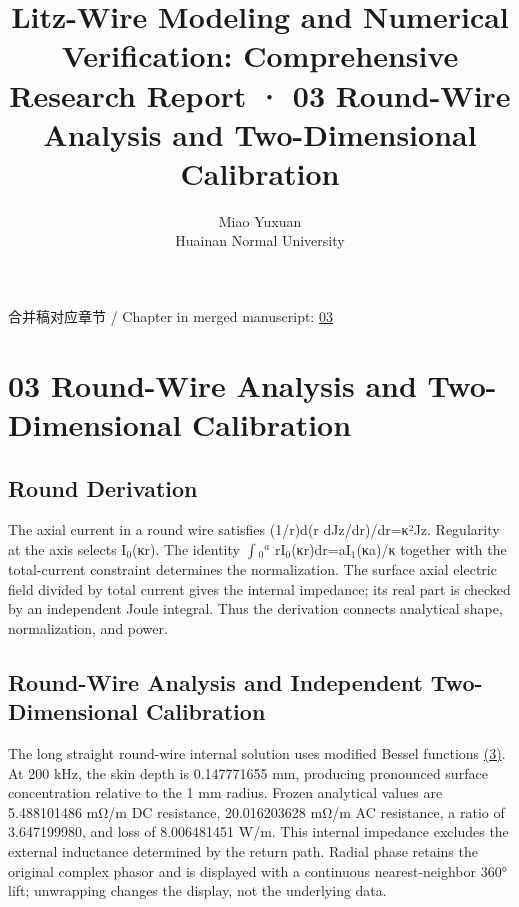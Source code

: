 \documentclass[11pt]{article}
\begin{document}
\title{Litz-Wire Modeling and Numerical Verification: Comprehensive Research Report · 03 Round-Wire Analysis and Two-Dimensional Calibration}
\author{Miao Yuxuan\\Huainan Normal University}
\date{}
\maketitle
\noindent 合并稿对应章节 / Chapter in merged manuscript: \href{report_en_single.pdf#chapter-03}{03}\par
\FloatBarrier
\section*{03 Round-Wire Analysis and Two-Dimensional Calibration}
\hypertarget{chapter-03}{}
\subsection*{Round Derivation}
\hypertarget{03.round_derivation.heading}{}
The axial current in a round wire satisfies (1/r)d(r dJz/dr)/dr=κ²Jz. Regularity at the axis selects I\(_0\)(κr). The identity \(\int\)\(_0\)\(^a\) rI\(_0\)(κr)dr=aI\(_1\)(κa)/κ together with the total-current constraint determines the normalization. The surface axial electric field divided by total current gives the internal impedance; its real part is checked by an independent Joule integral. Thus the derivation connects analytical shape, normalization, and power.


\subsection*{Round-Wire Analysis and Independent Two-Dimensional Calibration}
\hypertarget{03.analytic.heading}{}
The long straight round-wire internal solution uses modified Bessel functions \href{report_en_single.pdf#E03}{(3)}. At 200 kHz, the skin depth is 0.147771655 mm, producing pronounced surface concentration relative to the 1 mm radius. Frozen analytical values are 5.488101486 mΩ/m DC resistance, 20.016203628 mΩ/m AC resistance, a ratio of 3.647199980, and loss of 8.006481451 W/m. This internal impedance excludes the external inductance determined by the return path. Radial phase retains the original complex phasor and is displayed with a continuous nearest-neighbor 360° lift; unwrapping changes the display, not the underlying data.
\end{document}

